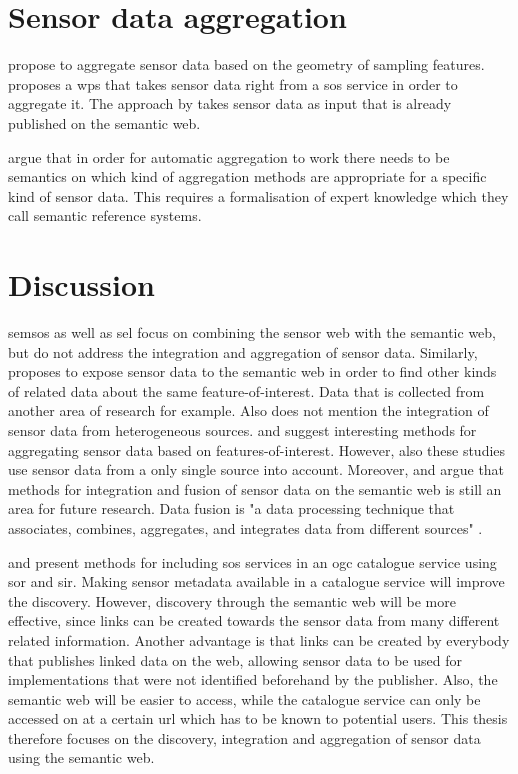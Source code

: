 \section{Sensor data aggregation}
\cite{SSW:Stasch} propose to aggregate sensor data based on the geometry of sampling features. \cite{SSW:Stasch3} proposes a \ac{wps} that takes sensor data right from a \ac{sos} service in order to aggregate it. The approach by \cite{SSW:Stasch} takes sensor data as input that is already published on the semantic web.

\cite{SSW:Stasch4} argue that in order for automatic aggregation to work there needs to be semantics on which kind of aggregation methods are appropriate for a specific kind of sensor data. This requires a formalisation of expert knowledge which they call semantic reference systems. 

\section{Discussion}
\ac{semsos} \citep{SSW:Henson, SSW:Pschorr} as well as \ac{sel} \citep{SSW:Janowicz} focus on combining the sensor web with the semantic web, but do not address the integration and aggregation of sensor data. Similarly, \cite{SSW:Atkinson} proposes to expose sensor data to the semantic web in order to find other kinds of related data about the same feature-of-interest. Data that is collected from another area of research for example. Also \cite{SSW:Atkinson} does not mention the integration of sensor data from heterogeneous sources. \cite{SSW:Stasch} and \cite{SSW:Stasch3} suggest interesting methods for aggregating sensor data based on features-of-interest. However, also these studies use sensor data from a only single source into account. Moreover, \cite{SSW:Corcho} and \cite{SSW:Ji} argue that methods for integration and fusion of sensor data on the semantic web is still an area for future research. Data fusion is "a data processing technique that associates, combines, aggregates, and integrates data from different sources" \cite[p. 2]{SSW:Wang2}. 

\cite{SW:OGC3} and \cite{SW:OGC4} present methods for including \ac{sos} services in an \ac{ogc} catalogue service using \ac{sor} and \ac{sir}. Making sensor metadata available in a catalogue service will improve the discovery. However, discovery through the semantic web will be more effective, since links can be created towards the sensor data from many different related information. Another advantage is that links can be created by everybody that publishes linked data on the web, allowing sensor data to be used for implementations that were not identified beforehand by the publisher. Also, the semantic web will be easier to access, while the catalogue service can only be accessed on at a certain \ac{url} which has to be known to potential users. This thesis therefore focuses on the discovery, integration and aggregation of sensor data using the semantic web.

